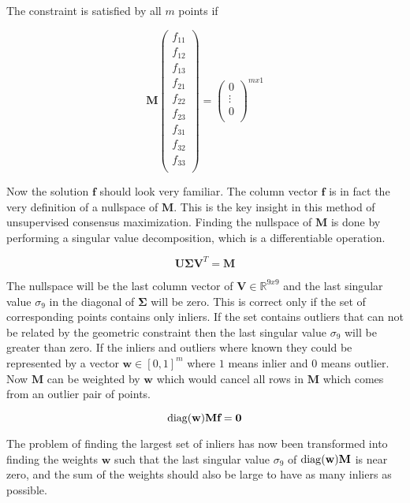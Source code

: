 The constraint is satisfied by all $m$ points if

\begin{equation}
\textbf{M}
\begin{pmatrix}
f_{11} \\
f_{12} \\
f_{13} \\
f_{21} \\
f_{22} \\
f_{23} \\
f_{31} \\
f_{32} \\
f_{33} \\
\end{pmatrix}
=
\begin{pmatrix}
0 \\
\vdots \\
0 \\
\end{pmatrix}
^{mx1}
\end{equation}

Now the solution $\textbf{f}$ should look very familiar. The column vector $\textbf{f}$ is in fact the very definition of a nullspace of $\mathbf{M}$. This is the key insight in this method of unsupervised consensus maximization. Finding the nullspace of $\mathbf{M}$ is done by performing a singular value decomposition, which is a differentiable operation.

\begin{equation}
\mathbf{U}\mathbf{\Sigma}\mathbf{V}^T=\mathbf{M}
\end{equation}

The nullspace will be the last column vector of $\mathbf{V} \in \mathbb{R}^{9x9}$ and the last singular value $\sigma_9$ in the diagonal of $\mathbf{\Sigma}$ will be zero. This is correct only if the set of corresponding points contains only inliers. If the set contains outliers that can not be related by the geometric constraint then the last singular value $\sigma_9$ will be greater than zero. If the inliers and outliers where known they could be represented by a vector $\textbf{w} \in [0,1]^m$ where $ 1 $ means inlier and $ 0 $ means outlier. Now $\mathbf{M}$ can be weighted by $\textbf{w}$ which would cancel all rows in $\mathbf{M}$ which comes from an outlier pair of points.

\[
\operatorname{diag}(\textbf{w}) \mathbf{M} \textbf{f} = \textbf{0}
\] 

The problem of finding the largest set of inliers has now been transformed into finding the weights $\textbf{w}$ such that the last singular value $\sigma_9$ of $\operatorname{diag}(\textbf{w})\mathbf{M}$ is near zero, and the sum of the weights should also be large to have as many inliers as possible.

